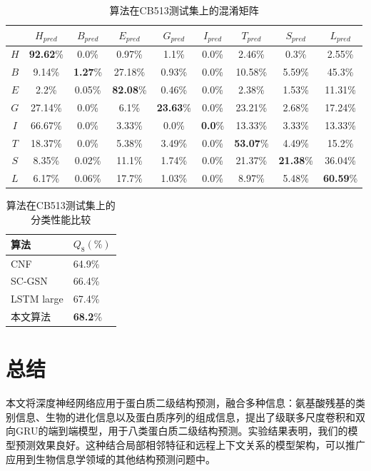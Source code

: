 \documentclass[a4paper, tikz]{article}
\begin{document}
\begin{table}[htbp]
\renewcommand\arraystretch{1.2}
\caption{算法在CB513测试集上的混淆矩阵}
\center
\begin{tabular}{ccccccccc}
\toprule
 & $H_{pred}$& $B_{pred}$& $E_{pred}$& $G_{pred}$& $I_{pred}$& $T_{pred}$& $S_{pred}$& $L_{pred}$\\
\midrule
$H$& \textbf{92.62}\%& 0.0\%& 0.97\%& 1.1\%&	0.0\%& 2.46\%& 0.3\%& 2.55\%	\\
$B$& 9.14\%& \textbf{1.27}\%& 27.18\%& 0.93\%& 0.0\%& 10.58\%& 5.59\%& 45.3\%\\
$E$& 2.2\%& 0.05\%& \textbf{82.08}\%& 0.46\%& 0.0\%& 2.38\%& 1.53\%& 11.31\%\\
$G$& 27.14\%& 0.0\%& 6.1\%& \textbf{23.63}\%& 0.0\%& 23.21\%& 2.68\%& 17.24\%\\
$I$& 66.67\%& 0.0\%& 3.33\%& 0.0\%& \textbf{0.0}\%& 13.33\%& 3.33\%& 13.33\%\\
$T$& 18.37\%& 0.0\%& 5.38\%& 3.49\%& 0.0\%& \textbf{53.07}\%& 4.49\%& 15.2\%\\
$S$& 8.35\%& 0.02\%& 11.1\%& 1.74\%& 0.0\%& 21.37\%& \textbf{21.38}\%& 36.04\%\\
$L$& 6.17\%& 0.06\%& 17.7\%& 1.03\%& 0.0\%& 8.97\%& 5.48\%& \textbf{60.59}\%\\
\bottomrule
\end{tabular}
\end{table}

\begin{table}[htbp]
\renewcommand\arraystretch{1.2}
\caption{算法在CB513测试集上的分类性能比较}
\center
\begin{tabular}{p{60pt}<{\centering} p{40pt}<{\centering}}
\toprule
算法& $Q_8(\%)$\\
\midrule
CNF& 64.9\%\\
SC-GSN& 66.4\%\\
LSTM large& 67.4\%\\
本文算法& \textbf{68.2}\%\\
\bottomrule
\end{tabular}
\end{table}
\newpage


\section{总结}

本文将深度神经网络应用于蛋白质二级结构预测，融合多种信息：氨基酸残基的类别信息、⽣物的进化信息以及蛋白质序列的组成信息，提出了级联多尺度卷积和双向GRU的端到端模型，用于八类蛋白质二级结构预测。实验结果表明，我们的模型预测效果良好。这种结合局部相邻特征和远程上下文关系的模型架构，可以推广应用到生物信息学领域的其他结构预测问题中。
\end{document}
